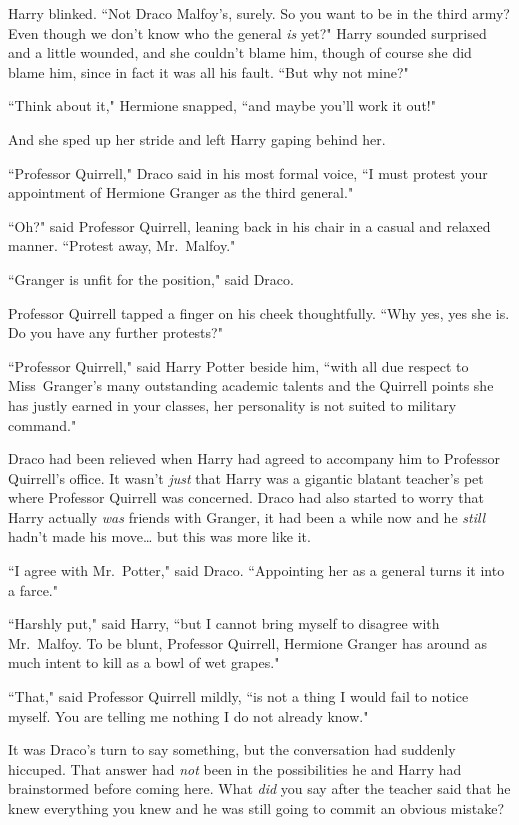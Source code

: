Harry blinked. ``Not Draco Malfoy's, surely. So you want to be in the third army? Even though we don't know who the general \emph{is} yet?" Harry sounded surprised and a little wounded, and she couldn't blame him, though of course she did blame him, since in fact it was all his fault. ``But why not mine?"

``Think about it," Hermione snapped, ``and maybe you'll work it out!"

And she sped up her stride and left Harry gaping behind her.

\later

``Professor Quirrell," Draco said in his most formal voice, ``I must protest your appointment of Hermione Granger as the third general."

``Oh?" said Professor Quirrell, leaning back in his chair in a casual and relaxed manner. ``Protest away, Mr.~Malfoy."

``Granger is unfit for the position," said Draco.

Professor Quirrell tapped a finger on his cheek thoughtfully. ``Why yes, yes she is. Do you have any further protests?"

``Professor Quirrell," said Harry Potter beside him, ``with all due respect to Miss~Granger's many outstanding academic talents and the Quirrell points she has justly earned in your classes, her personality is not suited to military command."

Draco had been relieved when Harry had agreed to accompany him to Professor Quirrell's office. It wasn't \emph{just} that Harry was a gigantic blatant teacher's pet where Professor Quirrell was concerned. Draco had also started to worry that Harry actually \emph{was} friends with Granger, it had been a while now and he \emph{still} hadn't made his move{\ldots} but this was more like it.

``I agree with Mr.~Potter," said Draco. ``Appointing her as a general turns it into a farce."

``Harshly put," said Harry, ``but I cannot bring myself to disagree with Mr.~Malfoy. To be blunt, Professor Quirrell, Hermione Granger has around as much intent to kill as a bowl of wet grapes."

``That," said Professor Quirrell mildly, ``is not a thing I would fail to notice myself. You are telling me nothing I do not already know."

It was Draco's turn to say something, but the conversation had suddenly hiccuped. That answer had \emph{not} been in the possibilities he and Harry had brainstormed before coming here. What \emph{did} you say after the teacher said that he knew everything you knew and he was still going to commit an obvious mistake?

